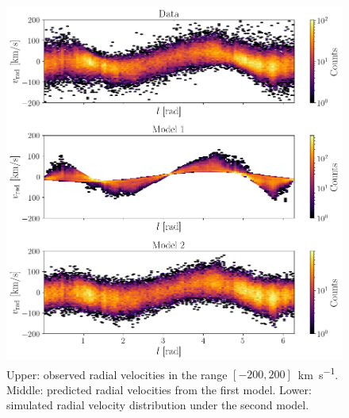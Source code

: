 \begin{figure}[H]
    \centering
    \includegraphics[width=0.95\columnwidth]{Fig/DataModelPresentation.png}
    \caption{Upper: observed radial velocities in the range $[-200, 200]$~\unit{\kilo\meter\per\second}. Middle: predicted radial velocities from the first model. Lower: simulated radial velocity distribution under the second model.}
    \label{fig:DataModelPresentation}
\end{figure}
